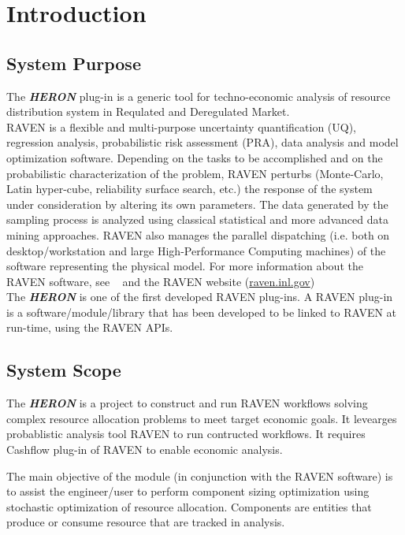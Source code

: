 \section{Introduction}
\subsection{System Purpose}

The \textbf{\textit{HERON}} plug-in is a generic tool for techno-economic analysis of resource distribution system in Requlated and Deregulated Market.
\\RAVEN is a flexible and multi-purpose uncertainty quantification (UQ), regression analysis, probabilistic risk assessment 
(PRA), data analysis and model optimization software.  Depending on the tasks to be accomplished and on the 
probabilistic
 characterization of the problem, RAVEN perturbs (Monte-Carlo, Latin hyper-cube, reliability surface search, etc.) the
 response of the system under consideration by altering its own parameters. 
 The data generated by the sampling process is analyzed using classical statistical
 and more advanced data mining approaches. RAVEN also manages the parallel dispatching (i.e. both on
 desktop/workstation and large High-Performance Computing machines) of the software representing the physical 
 model.
 For more information about the RAVEN software, see ~\cite{RAVENuserManual} and the RAVEN website (\url{raven.inl.gov})
\\The  \textbf{\textit{HERON}} is one of the first developed RAVEN plug-ins. 
A RAVEN plug-in is a software/module/library that has been developed to be linked to RAVEN at run-time, using the RAVEN APIs.


\subsection{System Scope}

The \textbf{\textit{HERON}} is a project to construct and run RAVEN workflows solving complex resource allocation problems 
to meet target economic goals. It levearges probablistic analysis tool RAVEN to run contructed workflows.
It requires Cashflow plug-in of RAVEN to enable economic analysis.

 The main objective of the module (in conjunction with the RAVEN software) is to assist the engineer/user to perform
component sizing optimization using stochastic optimization of resource allocation. Components are entities that produce
or consume resource that are tracked in analysis.


